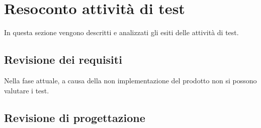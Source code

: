 \section{Resoconto attività di test}
In questa sezione vengono descritti e analizzati gli esiti delle attività
di test.

\subsection{Revisione dei requisiti}

Nella fase attuale, a causa della non implementazione del prodotto non si possono valutare i test.


\subsection{Revisione di progettazione}